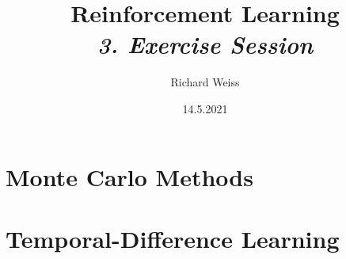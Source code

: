 \documentclass{article}
\title
{
    Reinforcement Learning \\
    \vspace{4pt}
    \normalsize
    \textit{3. Exercise Session}
}
\author{Richard Weiss}
\date{14.5.2021}
\numberwithin{figure}{section}
\begin{document}
\maketitle

\setcounter{section}{3}
\section{Monte Carlo Methods}








\setcounter{section}{4}
\section{Temporal-Difference Learning}









\printbibliography
\end{document}
